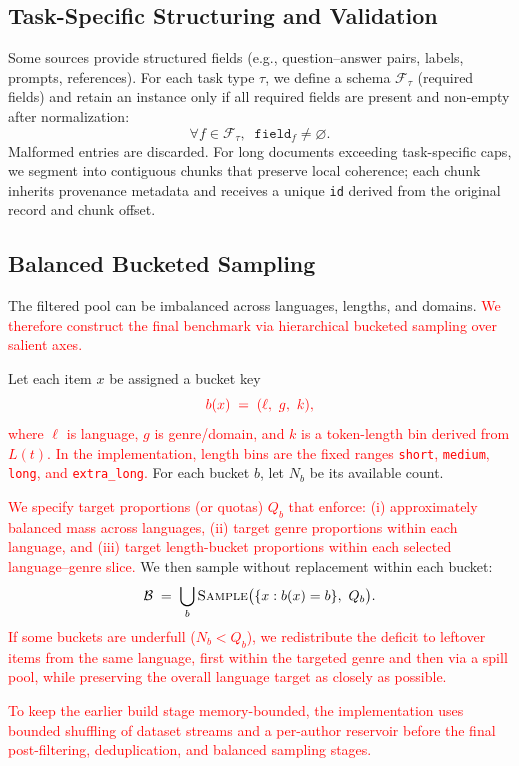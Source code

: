 \documentclass[11pt]{article}
\newcommand{\rev}[1]{\textcolor{red}{#1}}
\begin{document}
\subsection{Task-Specific Structuring and Validation}
\label{subsec:construct-struct}
Some sources provide structured fields (e.g., question--answer pairs, labels, prompts, references). For each task type $\tau$, we define a schema $\mathcal{F}_{\tau}$ (required fields) and retain an instance only if all required fields are present and non-empty after normalization:
\[
\forall f \in \mathcal{F}_{\tau},\;\; \texttt{field}_f \neq \varnothing.
\]
Malformed entries are discarded. For long documents exceeding task-specific caps, we segment into contiguous chunks that preserve local coherence; each chunk inherits provenance metadata and receives a unique \texttt{id} derived from the original record and chunk offset.

\subsection{Balanced Bucketed Sampling}
\label{subsec:construct-buckets}
The filtered pool can be imbalanced across languages, lengths, and domains. \rev{We therefore construct the final benchmark via hierarchical bucketed sampling over salient axes.}

Let each item $x$ be assigned a bucket key
\[
{\color{red} b(x) \;=\; (\ell,\ g,\ k),}
\]
\rev{where $\ell$ is language, $g$ is genre/domain, and $k$ is a token-length bin derived from $L(t)$. In the implementation, length bins are the fixed ranges \texttt{short}, \texttt{medium}, \texttt{long}, and \texttt{extra\_long}.} For each bucket $b$, let $N_b$ be its available count.

\rev{We specify target proportions (or quotas) $Q_b$ that enforce: (i) approximately balanced mass across languages, (ii) target genre proportions within each language, and (iii) target length-bucket proportions within each selected language--genre slice.} We then sample without replacement within each bucket:
\[
\mathcal{B} \;=\; \bigcup_{b} \textsc{Sample}\big(\{x: b(x)=b\},\ Q_b\big).
\]
\rev{If some buckets are underfull ($N_b < Q_b$), we redistribute the deficit to leftover items from the same language, first within the targeted genre and then via a spill pool, while preserving the overall language target as closely as possible.}

\rev{To keep the earlier build stage memory-bounded, the implementation uses bounded shuffling of dataset streams and a per-author reservoir before the final post-filtering, deduplication, and balanced sampling stages.}
\end{document}
